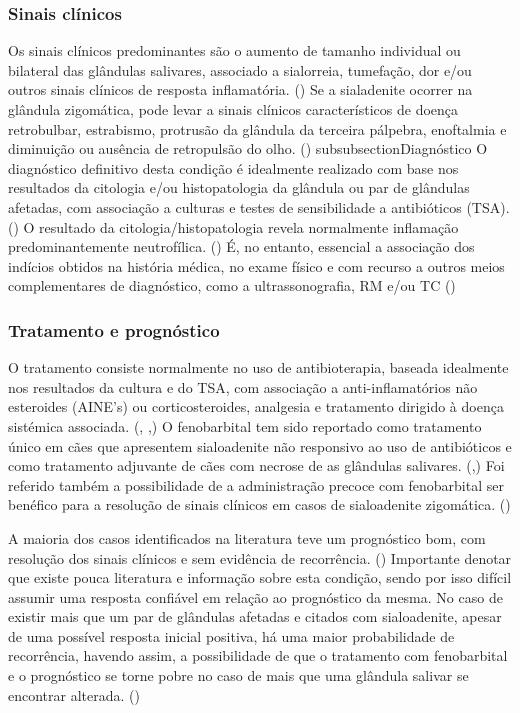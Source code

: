 \subsubsection{Sinais clínicos}
Os sinais clínicos predominantes são o aumento de tamanho individual ou bilateral das glândulas salivares, associado a sialorreia, tumefação, dor e/ou outros sinais clínicos de resposta inflamatória. (\cite{McGill2009}) Se a sialadenite ocorrer na glândula zigomática, pode levar a sinais clínicos característicos de doença retrobulbar, estrabismo, protrusão da glândula da terceira pálpebra, enoftalmia e diminuição ou ausência de retropulsão do olho. (\cite{11cases})
subsubsection{Diagnóstico}
O diagnóstico definitivo desta condição é idealmente realizado com base nos resultados da citologia e/ou histopatologia da glândula ou par de glândulas afetadas, com associação a culturas e testes de sensibilidade a antibióticos (TSA). (\cite{Enache2025}) O resultado da citologia/histopatologia   revela normalmente inflamação predominantemente neutrofílica. (\cite{Enache2025}) É, no entanto, essencial a associação dos indícios obtidos na história médica, no exame físico e com recurso a outros meios complementares de diagnóstico, como a ultrassonografia, RM e/ou TC  (\cite{Enache2025})

\subsubsection{Tratamento e prognóstico}

O tratamento consiste normalmente no uso de antibioterapia, baseada idealmente nos resultados da cultura e do TSA, com associação a anti-inflamatórios não esteroides (AINE’s) ou corticosteroides, analgesia e tratamento dirigido à doença sistémica associada. (\cite{Park2022}, \cite{Enache2025},\cite{sialadenite}) O fenobarbital tem sido reportado como tratamento único em cães que apresentem sialoadenite não responsivo ao uso de antibióticos e como tratamento adjuvante de cães com necrose de as glândulas salivares. (\cite{Park2022},\cite{Enache2025}) Foi referido também a possibilidade de a administração precoce com fenobarbital ser benéfico para a resolução de sinais clínicos em casos de sialoadenite zigomática. (\cite{Martinez2018})


A maioria dos casos identificados na literatura teve um prognóstico bom, com resolução dos sinais clínicos e sem evidência de recorrência. (\cite{sialadenite}) Importante denotar que existe pouca literatura e informação sobre esta condição, sendo por isso difícil assumir uma resposta confiável em relação ao prognóstico da mesma.   
No caso de existir mais que um par de glândulas afetadas e citados \cite{Kumar2017} com sialoadenite, apesar de uma possível resposta inicial positiva, há uma maior probabilidade de recorrência, havendo assim, a possibilidade de que o tratamento com fenobarbital e o prognóstico se torne pobre no caso de mais que uma glândula salivar se encontrar alterada. (\cite{Park2022})

